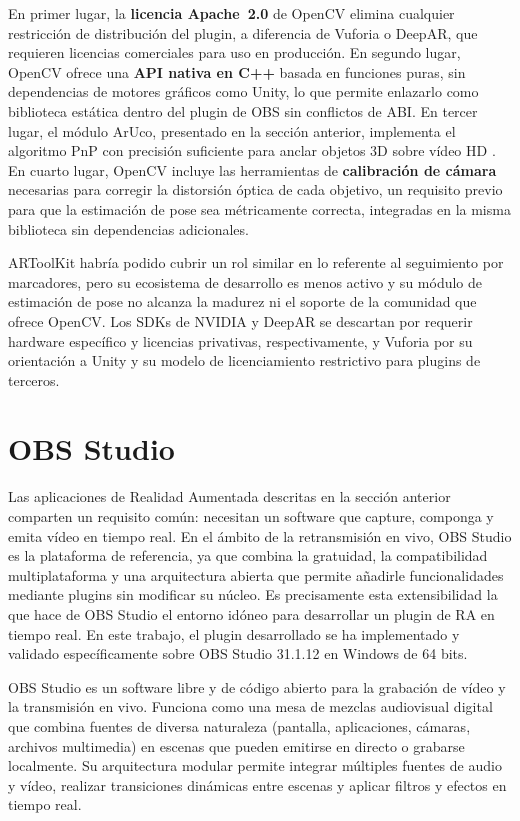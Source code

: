 En primer lugar, la \textbf{licencia Apache~2.0} de OpenCV elimina cualquier restricción de distribución del plugin, a diferencia de Vuforia o DeepAR, que requieren licencias comerciales para uso en producción. En segundo lugar, OpenCV ofrece una \textbf{API nativa en C++} basada en funciones puras, sin dependencias de motores gráficos como Unity, lo que permite enlazarlo como biblioteca estática dentro del plugin de OBS sin conflictos de ABI. En tercer lugar, el módulo ArUco, presentado en la sección anterior, implementa el algoritmo PnP con precisión suficiente para anclar objetos 3D sobre vídeo HD \citep{GarridoJurado2014}. En cuarto lugar, OpenCV incluye las herramientas de \textbf{calibración de cámara} necesarias para corregir la distorsión óptica de cada objetivo, un requisito previo para que la estimación de pose sea métricamente correcta, integradas en la misma biblioteca sin dependencias adicionales.

ARToolKit habría podido cubrir un rol similar en lo referente al seguimiento por marcadores, pero su ecosistema de desarrollo es menos activo y su módulo de estimación de pose no alcanza la madurez ni el soporte de la comunidad que ofrece OpenCV. Los SDKs de NVIDIA y DeepAR se descartan por requerir hardware específico y licencias privativas, respectivamente, y Vuforia por su orientación a Unity y su modelo de licenciamiento restrictivo para plugins de terceros.

\section{OBS Studio}
\label{sec:obs_studio}

Las aplicaciones de Realidad Aumentada descritas en la sección anterior comparten un requisito común: necesitan un software que capture, componga y emita vídeo en tiempo real. En el ámbito de la retransmisión en vivo, OBS Studio \cite{OBS} es la plataforma de referencia, ya que combina la gratuidad, la compatibilidad multiplataforma y una arquitectura abierta que permite añadirle funcionalidades mediante plugins sin modificar su núcleo. Es precisamente esta extensibilidad la que hace de OBS Studio el entorno idóneo para desarrollar un plugin de RA en tiempo real. En este trabajo, el plugin desarrollado se ha implementado y validado específicamente sobre OBS Studio 31.1.12 en Windows de 64 bits.

OBS Studio es un software libre y de código abierto para la grabación de vídeo y la transmisión en vivo. Funciona como una mesa de mezclas audiovisual digital que combina fuentes de diversa naturaleza (pantalla, aplicaciones, cámaras, archivos multimedia) en escenas que pueden emitirse en directo o grabarse localmente. Su arquitectura modular permite integrar múltiples fuentes de audio y vídeo, realizar transiciones dinámicas entre escenas y aplicar filtros y efectos en tiempo real.

